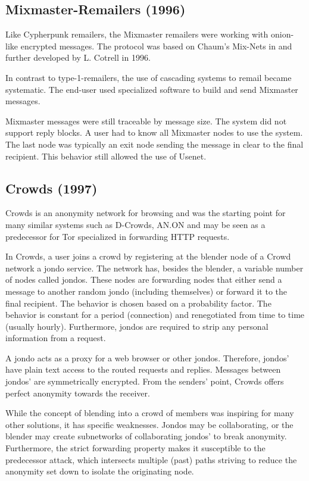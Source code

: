 \subsection{Mixmaster-Remailers (1996)\label{sec:remMixmaster}}
Like Cypherpunk remailers, the Mixmaster remailers were working with onion-like encrypted messages. The protocol was based on Chaum's Mix-Nets in \cite{CHAUM1} and further developed by L. Cotrell in 1996. 

In contrast to type-1-remailers, the use of cascading systems to remail became systematic. The end-user used specialized software to build and send Mixmaster messages.

Mixmaster messages were still traceable by message size. The system did not support reply blocks. A user had to know all Mixmaster nodes to use the system. The last node was typically an exit node sending the message in clear to the final recipient. This behavior still allowed the use of Usenet.

\subsection{Crowds (1997)}
Crowds is an anonymity network for browsing and was the starting point for many similar systems such as D-Crowds, AN.ON and may be seen as a predecessor for Tor specialized in forwarding HTTP requests. 

In Crowds, a user joins a crowd by registering at the blender node of a Crowd network a jondo service. The network has, besides the blender, a variable number of nodes called jondos. These nodes are forwarding nodes that either send a message to another random jondo (including themselves) or forward it to the final recipient. The behavior is chosen based on a probability factor. The behavior is constant for a period (connection) and renegotiated from time to time (usually hourly). Furthermore, jondos are required to strip any personal information from a request. 

A jondo acts as a proxy for a web browser or other jondos. Therefore, jondos' have plain text access to the routed requests and replies. Messages between jondos' are symmetrically encrypted. From the senders' point, Crowds offers perfect anonymity towards the receiver. 

While the concept of blending into a crowd of members was inspiring for many other solutions, it has specific weaknesses. Jondos may be collaborating, or the blender may create subnetworks of collaborating jondos' to break anonymity. Furthermore, the strict forwarding property makes it susceptible to the predecessor attack\cite{wright2004predecessor}, which intersects multiple (past) paths striving to reduce the anonymity set down to isolate the originating node.

